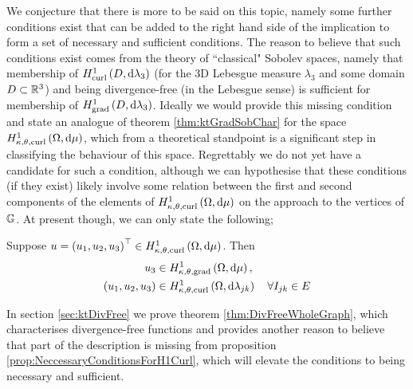 We conjecture that there is more to be said on this topic, namely some further conditions exist that can be added to the right hand side of the implication to form a set of necessary and sufficient conditions.
The reason to believe that such conditions exist comes from the theory of ``classical" Sobolev spaces, namely that membership of $H^1_\mathrm{curl}\left( D, \mathrm{d}\lambda_3 \right)$ (for the 3D Lebesgue measure $\lambda_3$ and some domain $D\subset\mathbb{R}^3$) and being divergence-free (in the Lebesgue sense) is sufficient for membership of $H^1_\mathrm{grad}\left( D, \mathrm{d}\lambda_3 \right)$.
Ideally we would provide this missing condition and state an analogue of theorem \ref{thm:ktGradSobChar} for the space $H^1_{\kappa,\theta,\mathrm{curl}}\left( \Omega, \mathrm{d}\mu \right)$, which from a theoretical standpoint is a significant step in classifying the behaviour of this space.
Regrettably we do not yet have a candidate for such a condition, although we can hypothesise that these conditions (if they exist) likely involve some relation between the first and second components of the elements of $H^1_{\kappa,\theta,\mathrm{curl}}\left( \Omega, \mathrm{d}\mu \right)$ on the approach to the vertices of $\mathbb{G}$.
At present though, we can only state the following;
\begin{prop} \label{prop:NeccessaryConditionsForH1Curl}
	Suppose $u=\left( u_1,u_2,u_3 \right)^{\top} \in H^1_{\kappa,\theta,\mathrm{curl}}\left( \Omega, \mathrm{d}\mu \right)$.
	Then
	\begin{align*}
		u_3 &\in H^1_{\kappa,\theta,\mathrm{grad}}\left( \Omega, \mathrm{d}\mu \right), \\
		\left( u_1,u_2,u_3 \right) &\in H^1_{\kappa,\theta,\mathrm{curl}}\left( \Omega, \mathrm{d}\lambda_{jk} \right) \quad \forall I_{jk}\in E
	\end{align*}
\end{prop}
In section \ref{sec:ktDivFree} we prove theorem \ref{thm:DivFreeWholeGraph}, which characterises divergence-free functions and provides another reason to believe that part of the description is missing from proposition \ref{prop:NeccessaryConditionsForH1Curl}, which will elevate the conditions to being necessary and sufficient.

